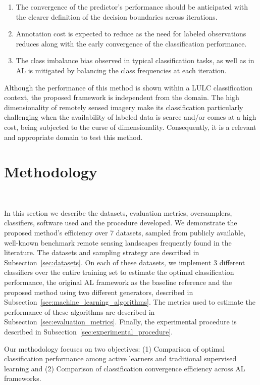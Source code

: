 \documentclass[parskip=full]{scrartcl}
\begin{document}
\begin{enumerate}
    \item The convergence of the predictor's performance should be anticipated
        with the clearer definition of the decision boundaries across
        iterations.
    \item Annotation cost is expected to reduce as the need for labeled
        observations reduces along with the early convergence of the
        classification performance.
    \item The class imbalance bias observed in typical classification tasks, as
        well as in AL is mitigated by balancing the class frequencies at each
        iteration.
\end{enumerate}

Although the performance of this method is shown within a LULC classification
context, the proposed framework is independent from the domain. The high
dimensionality of remotely sensed imagery make its classification particularly
challenging when the availability of labeled data is scarce and/or comes at a
high cost, being subjected to the curse of dimensionality. Consequently, it is a
relevant and appropriate domain to test this method.

\section{Methodology}~\label{sec:methodology}

In this section we describe the datasets, evaluation metrics, oversamplers,
classifiers, software used and the procedure developed. We demonstrate the
proposed method's efficiency over 7 datasets, sampled from publicly available,
well-known benchmark remote sensing landscapes frequently found in the
literature. The datasets and sampling strategy are described in
Subsection~\ref{sec:datasets}. On each of these datasets, we implement 3
different classifiers over the entire training set to estimate the optimal
classification performance, the original AL framework as the baseline
reference and the proposed method using two different generators, described in
Subsection~\ref{sec:machine_learning_algorithms}. The metrics used to estimate
the performance of these algorithms are described in
Subsection~\ref{sec:evaluation_metrics}. Finally, the experimental procedure is
described in Subsection~\ref{sec:experimental_procedure}. 

Our methodology focuses on two objectives: (1) Comparison of optimal
classification performance among active learners and traditional supervised
learning and (2) Comparison of classification convergence efficiency across AL
frameworks.
\end{document}
